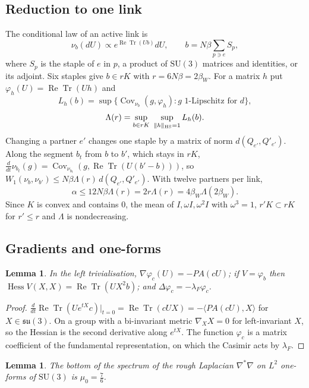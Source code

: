 \documentclass[aps,prd,twocolumn,superscriptaddress,nofootinbib,longbibliography,floatfix,amsmath,amssymb,10pt]{revtex4-2}
\newtheorem{lemma}[theorem]{Lemma}
\theoremstyle{definition}
\theoremstyle{remark}
\newcommand{\SU}{\mathrm{SU}}
\newcommand{\ReTr}{\operatorname{Re}\operatorname{Tr}}
\newcommand{\Hess}{\operatorname{Hess}}
\newcommand{\Cov}{\operatorname{Cov}}
\newcommand{\ip}[2]{\langle #1,#2\rangle}
\begin{document}
\subsection{Reduction to one link}

The conditional law of an active link is
\[
\nu_b(dU)\propto e^{\ReTr(Ub)}dU,\qquad b=N\beta\sum_{p\ni e}S_p ,
\]
where $S_p$ is the staple of $e$ in $p$, a product of $\SU(3)$ matrices and
identities, or its adjoint. Six staples give $b\in rK$ with
$r=6N\beta=2\beta_W$. For a matrix $h$ put $\varphi_h(U)=\ReTr(Uh)$ and
\[
L_h(b)=\sup\{\Cov_{\nu_b}(g,\varphi_h):g\text{ 1-Lipschitz for }d\},
\]
\[
\Lambda(r)=\sup_{b\in rK}\ \sup_{\|h\|_{\rm HS}=1}L_h(b).
\]
Changing a partner $e'$ changes one staple by a matrix of norm $d(Q_{e'},
Q'_{e'})$. Along the segment $b_t$ from $b$ to $b'$, which stays in $rK$,
$\frac d{dt}\nu_{b_t}(g)=\Cov_{\nu_{b_t}}(g,\ReTr(U(b'-b)))$, so
$W_1(\nu_b,\nu_{b'})\le N\beta\Lambda(r)\,d(Q_{e'},Q'_{e'})$. With twelve
partners per link,
\begin{equation}\label{eq:alpha}
\alpha\le12N\beta\Lambda(r)=2r\Lambda(r)=4\beta_W\Lambda(2\beta_W).
\end{equation}
Since $K$ is convex and contains $0$, the mean of $I,\omega I,\omega^2I$ with
$\omega^3=1$, $r'K\subset rK$ for $r'\le r$ and $\Lambda$ is nondecreasing.

\subsection{Gradients and one-forms}

\begin{lemma}\label{lem:gradients}
In the left trivialisation, $\nabla\varphi_c(U)=-PA(cU)$; if $V=\varphi_b$
then $\Hess V(X,X)=\ReTr(UX^2b)$; and $\Delta\varphi_c=-\lambda_F\varphi_c$.
\end{lemma}

\begin{proof}
$\frac d{dt}\ReTr(Ue^{tX}c)|_{t=0}=\ReTr(cUX)=-\ip{PA(cU)}X$ for $X\in
\mathfrak{su}(3)$. On a group with a bi-invariant metric $\nabla_XX=0$ for
left-invariant $X$, so the Hessian is the second derivative along $e^{tX}$.
The function $\varphi_c$ is a matrix coefficient of the fundamental
representation, on which the Casimir acts by $\lambda_F$.
\end{proof}

\begin{lemma}\label{lem:roughlap}
The bottom of the spectrum of the rough Laplacian $\nabla^*\nabla$ on $L^2$
one-forms of $\SU(3)$ is $\mu_0=\frac76$.
\end{lemma}
\end{document}
